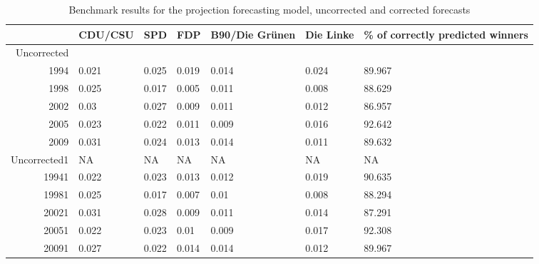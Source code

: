 \begin{table}[t!]
\centering
\caption{Benchmark results for the projection forecasting model, uncorrected and corrected forecasts} 
\begin{tabular}{rllllll}
  \hline
 & CDU/CSU & SPD & FDP & B90/Die Gr\"unen & Die Linke & \% of correctly predicted winners \\ 
  \hline
Uncorrected &  &  &  &  &  &  \\ 
  1994 & 0.021 & 0.025 & 0.019 & 0.014 & 0.024 & 89.967 \\ 
  1998 & 0.025 & 0.017 & 0.005 & 0.011 & 0.008 & 88.629 \\ 
  2002 & 0.03 & 0.027 & 0.009 & 0.011 & 0.012 & 86.957 \\ 
  2005 & 0.023 & 0.022 & 0.011 & 0.009 & 0.016 & 92.642 \\ 
  2009 & 0.031 & 0.024 & 0.013 & 0.014 & 0.011 & 89.632 \\ 
  Uncorrected1 &  NA &  NA &  NA &  NA &  NA &  NA \\ 
  19941 &  0.022 & \cellcolor{gray!25} 0.023 & \cellcolor{gray!25} 0.013 & \cellcolor{gray!25} 0.012 & \cellcolor{gray!25} 0.019 &  90.635 \\ 
  19981 & \cellcolor{gray!25} 0.025 & \cellcolor{gray!25} 0.017 &  0.007 & \cellcolor{gray!25} 0.01 & \cellcolor{gray!25} 0.008 & \cellcolor{gray!25} 88.294 \\ 
  20021 &  0.031 &  0.028 & \cellcolor{gray!25} 0.009 & \cellcolor{gray!25} 0.011 &  0.014 &  87.291 \\ 
  20051 & \cellcolor{gray!25} 0.022 &  0.023 & \cellcolor{gray!25} 0.01 & \cellcolor{gray!25} 0.009 &  0.017 & \cellcolor{gray!25} 92.308 \\ 
  20091 & \cellcolor{gray!25} 0.027 & \cellcolor{gray!25} 0.022 &  0.014 & \cellcolor{gray!25} 0.014 &  0.012 &  89.967 \\ 
   \hline
\end{tabular}
\end{table}
